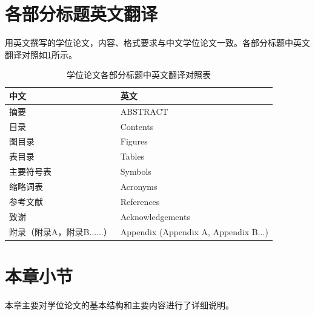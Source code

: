 \section{各部分标题英文翻译}

用英文撰写的学位论文，内容、格式要求与中文学位论文一致。各部分标题中英文翻译对照如\ref{tab1-1}所示。

\begin{table}[!ht]
\centering
\caption{学位论文各部分标题中英文翻译对照表}
\label{tab1-1}
\begin{tabularx}{\textwidth}{ 
>{\centering\arraybackslash}X 
>{\centering\arraybackslash}X
}
\toprule
中文 & 英文 \\
\midrule
摘要 & ABSTRACT \\
目录 & Contents \\
图目录 & Figures \\
表目录 & Tables \\
主要符号表 & Symbols \\
缩略词表 & Acronyms \\
参考文献 & References \\
致谢 & Acknowledgements \\
附录（附录A，附录B......） & Appendix (Appendix A, Appendix B...) \\
\bottomrule
\end{tabularx}
\end{table}

\section{本章小节}

本章主要对学位论文的基本结构和主要内容进行了详细说明。